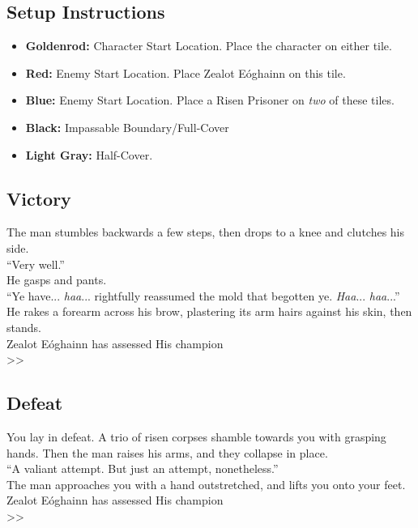 \subsection*{Setup Instructions}
\begin{itemize}
\item \textbf{Goldenrod:} Character Start Location. Place the character on either tile.
\item \textbf{Red:} Enemy Start Location. Place Zealot Eóghainn on this tile.
\item \textbf{Blue:} Enemy Start Location. Place a Risen Prisoner on \emph{two} of these tiles.
\item \textbf{Black:} Impassable Boundary/Full-Cover
\item \textbf{Light Gray:} Half-Cover.
\end{itemize}

\pagebreak

\subsection*{Victory}
The man stumbles backwards a few steps, then drops to a knee and clutches his side.\\

“Very well.”\\

He gasps and pants.\\
“Ye have... \emph{haa}... rightfully reassumed the mold that begotten ye. \emph{Haa}... \emph{haa}...”\\

He rakes a forearm across his brow, plastering its arm hairs against his skin, then stands.\\

 Zealot Eóghainn has assessed His champion\\
>> 

\subsection*{Defeat}
You lay in defeat. A trio of risen corpses shamble towards you with grasping hands. Then the man raises his arms, and they collapse in place.\\

“A valiant attempt. But just an attempt, nonetheless.”\\

The man approaches you with a hand outstretched, and lifts you onto your feet.\\

 Zealot Eóghainn has assessed His champion\\
>> 